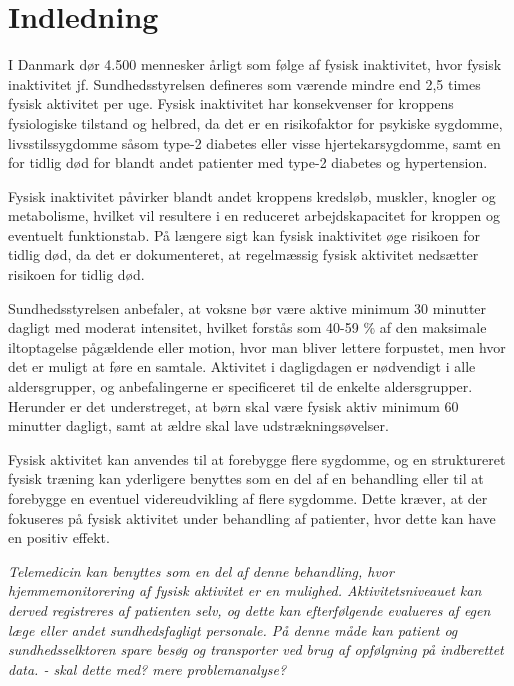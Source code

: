 \chapter{Indledning}
I Danmark dør 4.500 mennesker årligt som følge af fysisk inaktivitet, hvor fysisk inaktivitet jf. Sundhedsstyrelsen defineres som værende mindre end 2,5 times fysisk aktivitet per uge. \citep{aagaard2014} Fysisk inaktivitet har konsekvenser for kroppens fysiologiske tilstand og helbred, da det er en risikofaktor for psykiske sygdomme, livsstilssygdomme såsom type-2 diabetes eller visse hjertekarsygdomme, samt en for tidlig død for blandt andet patienter med type-2 diabetes og hypertension. \citep{motionsraad2007} 

Fysisk inaktivitet påvirker blandt andet kroppens kredsløb, muskler, knogler og metabolisme, hvilket vil resultere i en reduceret arbejdskapacitet for kroppen og eventuelt funktionstab. På længere sigt kan fysisk inaktivitet øge risikoen for tidlig død, da det er dokumenteret, at regelmæssig fysisk aktivitet nedsætter risikoen for tidlig død. \citep{motionsraad2007}

Sundhedsstyrelsen anbefaler, at voksne bør være aktive minimum 30 minutter dagligt med moderat intensitet, hvilket forstås som 40-59 $\%$ af den maksimale iltoptagelse pågældende eller motion, hvor man bliver lettere forpustet, men hvor det er muligt at føre en samtale.
Aktivitet i dagligdagen er nødvendigt i alle aldersgrupper, og anbefalingerne er specificeret til de enkelte aldersgrupper. Herunder er det understreget, at børn skal være fysisk aktiv minimum 60 minutter dagligt, samt at ældre skal lave udstrækningsøvelser. \citep{pedersen2011}

Fysisk aktivitet kan anvendes til at forebygge flere sygdomme, og en struktureret fysisk træning kan yderligere benyttes som en del af en behandling eller til at forebygge en eventuel videreudvikling af flere sygdomme. \citep{motionsraad2007} Dette kræver, at der fokuseres på fysisk aktivitet under behandling af patienter, hvor dette kan have en positiv effekt.

\textit{Telemedicin kan benyttes som en del af denne behandling, hvor hjemmemonitorering af fysisk aktivitet er en mulighed. Aktivitetsniveauet kan derved registreres af patienten selv, og dette kan efterfølgende evalueres af egen læge eller andet sundhedsfagligt personale. På denne måde kan patient og sundhedsselktoren spare besøg og transporter ved brug af opfølgning på indberettet data. \citep{medcom2010} - skal dette med? mere problemanalyse?}


